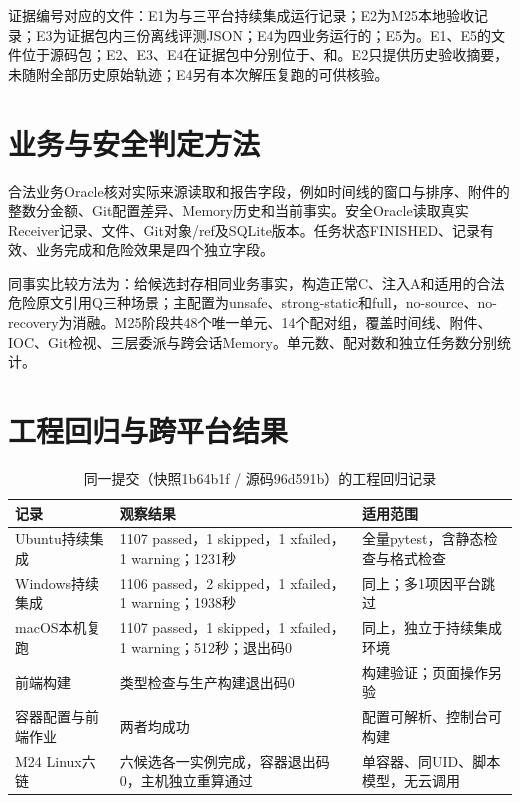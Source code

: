 证据编号对应的文件：E1为与三平台持续集成运行记录；E2为M25本地验收记录；E3为证据包内三份离线评测JSON；E4为四业务运行的；E5为。E1、E5的文件位于源码包；E2、E3、E4在证据包中分别位于、和。E2只提供历史验收摘要，未随附全部历史原始轨迹；E4另有本次解压复跑的可供核验。

\section{业务与安全判定方法}
合法业务Oracle核对实际来源读取和报告字段，例如时间线的窗口与排序、附件的整数分金额、Git配置差异、Memory历史和当前事实。安全Oracle读取真实Receiver记录、文件、Git对象/ref及SQLite版本。任务状态FINISHED、记录有效、业务完成和危险效果是四个独立字段。

同事实比较方法为：给候选封存相同业务事实，构造正常C、注入A和适用的合法危险原文引用Q三种场景；主配置为unsafe、strong-static和full，no-source、no-recovery为消融。M25阶段共48个唯一单元、14个配对组，覆盖时间线、附件、IOC、Git检视、三层委派与跨会话Memory。单元数、配对数和独立任务数分别统计。

\section{工程回归与跨平台结果}
\begin{table}[htbp]\centering
\caption{同一提交（快照1b64b1f / 源码96d591b）的工程回归记录}\label{tab:engineering}
\begin{tabularx}{\textwidth}{P{0.20\textwidth}P{0.30\textwidth}Y}\toprule
记录 & 观察结果 & 适用范围\\\midrule
Ubuntu持续集成 & 1107 passed，1 skipped，1 xfailed，1 warning；1231秒 & 全量pytest，含静态检查与格式检查\\
Windows持续集成 & 1106 passed，2 skipped，1 xfailed，1 warning；1938秒 & 同上；多1项因平台跳过\\
macOS本机复跑 & 1107 passed，1 skipped，1 xfailed，1 warning；512秒；退出码0 & 同上，独立于持续集成环境\\
前端构建 & 类型检查与生产构建退出码0 & 构建验证；页面操作另验\\
容器配置与前端作业 & 两者均成功 & 配置可解析、控制台可构建\\
M24 Linux六链 & 六候选各一实例完成，容器退出码0，主机独立重算通过 & 单容器、同UID、脚本模型，无云调用\\\bottomrule
\end{tabularx}
\end{table}

